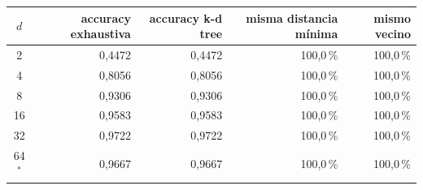 \begin{tabular}{crrrr}
\toprule
$d$ & accuracy exhaustiva & accuracy k-d tree & misma distancia mínima & mismo vecino \\
\midrule
2 & 0{,}4472 & 0{,}4472 & 100{,}0\,\% & 100{,}0\,\% \\
4 & 0{,}8056 & 0{,}8056 & 100{,}0\,\% & 100{,}0\,\% \\
8 & 0{,}9306 & 0{,}9306 & 100{,}0\,\% & 100{,}0\,\% \\
16 & 0{,}9583 & 0{,}9583 & 100{,}0\,\% & 100{,}0\,\% \\
32 & 0{,}9722 & 0{,}9722 & 100{,}0\,\% & 100{,}0\,\% \\
64$^{*}$ & 0{,}9667 & 0{,}9667 & 100{,}0\,\% & 100{,}0\,\% \\
\bottomrule
\end{tabular}
